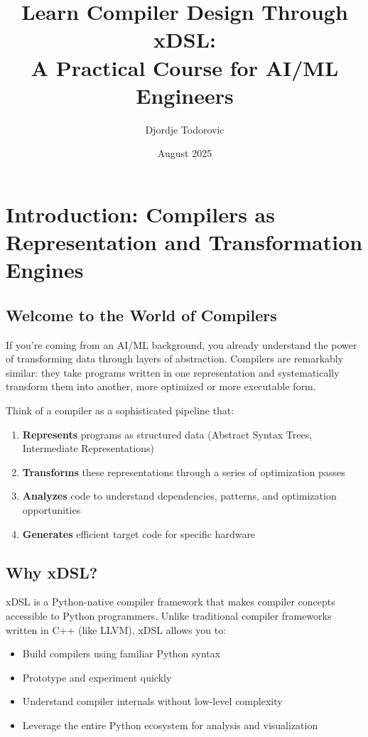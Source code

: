 \documentclass[11pt,a4paper]{article}
\title{Learn Compiler Design Through xDSL:\\
A Practical Course for AI/ML Engineers}
\author{Djordje Todorovic}
\date{August 2025}
\begin{document}
\maketitle

\tableofcontents
\newpage

\section{Introduction: Compilers as Representation and Transformation Engines}

\subsection{Welcome to the World of Compilers}

If you're coming from an AI/ML background, you already understand the power of transforming data through layers of abstraction. Compilers are remarkably similar: they take programs written in one representation and systematically transform them into another, more optimized or more executable form.

Think of a compiler as a sophisticated pipeline that:
\begin{enumerate}
    \item \textbf{Represents} programs as structured data (Abstract Syntax Trees, Intermediate Representations)
    \item \textbf{Transforms} these representations through a series of optimization passes
    \item \textbf{Analyzes} code to understand dependencies, patterns, and optimization opportunities
    \item \textbf{Generates} efficient target code for specific hardware
\end{enumerate}

\subsection{Why xDSL?}

xDSL is a Python-native compiler framework that makes compiler concepts accessible to Python programmers. Unlike traditional compiler frameworks written in C++ (like LLVM), xDSL allows you to:
\begin{itemize}
    \item Build compilers using familiar Python syntax
    \item Prototype and experiment quickly
    \item Understand compiler internals without low-level complexity
    \item Leverage the entire Python ecosystem for analysis and visualization
\end{itemize}
\end{document}
